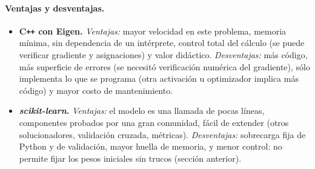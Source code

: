 \documentclass[11pt,a4paper]{article}
\newcommand{\cpp}{C\texttt{++}\xspace}
\newcommand{\sk}{\textit{scikit-learn}\xspace}
\begin{document}
\begin{table}[tbp]\centering\small
\caption{L\'ineas de c\'odigo por componente (no se cuentan la orquestaci\'on, el benchmark ni las pruebas).}\label{tab:loc}

\end{table}

\paragraph{Ventajas y desventajas.}
\begin{itemize}
\item \textbf{\cpp con Eigen.} \emph{Ventajas:} mayor velocidad en este problema, memoria m\'inima, sin dependencia de un int\'erprete, control total del c\'alculo (se puede verificar gradiente y asignaciones) y valor did\'actico. \emph{Desventajas:} m\'as c\'odigo, m\'as superficie de errores (se necesit\'o verificaci\'on num\'erica del gradiente), s\'olo implementa lo que se programa (otra activaci\'on u optimizador implica m\'as c\'odigo) y mayor costo de mantenimiento.
\item \textbf{\sk.} \emph{Ventajas:} el modelo es una llamada de pocas l\'ineas, componentes probados por una gran comunidad, f\'acil de extender (otros solucionadores, validaci\'on cruzada, m\'etricas). \emph{Desventajas:} sobrecarga fija de Python y de validaci\'on, mayor huella de memoria, y menor control: no permite fijar los pesos iniciales sin trucos (secci\'on anterior).
\end{itemize}
\end{document}
